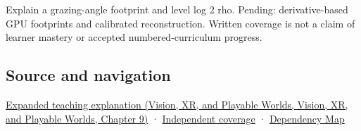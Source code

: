 Explain a grazing-angle footprint and level log 2 rho. Pending: derivative-based GPU footprints and calibrated reconstruction. Written coverage is not a claim of learner mastery or accepted numbered-curriculum progress.

\subsection{Source and navigation}\label{appendix-b677a85ba76f-source-and-navigation}

\href{../07-Vision-XR-and-Playable-Worlds/main.pdf\#nameddest=04-visual-computing-ii-ch042-multiresolution-work-must-preserve-the-right-information}{Expanded teaching explanation (Vision, XR, and Playable Worlds, Vision, XR, and Playable Worlds, Chapter 9)} · \hyperref[appendix-fd090d982a15-xr01---independent-seeing-and-representation-source]{Independent coverage} · \hyperref[appendix-4ad47bdd269a]{Dependency Map}
